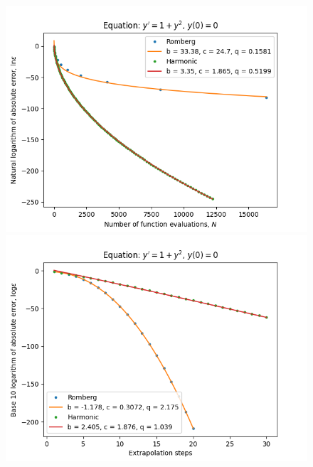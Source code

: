 \begin{figure}[H]
\centering
\begin{minipage}{0.45\textwidth}
\centering
\includegraphics[scale=0.45]{../results/emr_plots/tangens_hp_trend.png}
\end{minipage}
\begin{minipage}{0.45\textwidth}
\centering
\includegraphics[scale=0.45]{../results/emr_plots/tangens_hp_steps.png}
\end{minipage}
\end{figure}


